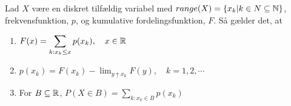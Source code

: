 \begin{minipage}\textwidth
\begin{pro} \textbf{} %
\newline
Lad $X$ være en diskret tilfældig variabel med $range(X)=\{x_k | k\in N \subseteq \mathbb{N}\}$, frekvensfunktion, $p$, og kumulative fordelingsfunktion, $F$. Så gælder det, at
\begin{enumerate}
    \item $\displaystyle F(x)=\displaystyle\sum_{k:x_k\leq x}p(x_k), \quad x\in\mathbb{R}$
    \item $\displaystyle p(x_k)=F(x_k)-\lim_{y\uparrow x_k} F(y), \quad k=1, 2,\cdots$
    \item For $B\subseteq \mathbb{R}$, $\displaystyle P(X\in B)=\displaystyle\sum_{k:x_k\in B}p(x_k)$
\end{enumerate}
\end{pro}
\end{minipage}
